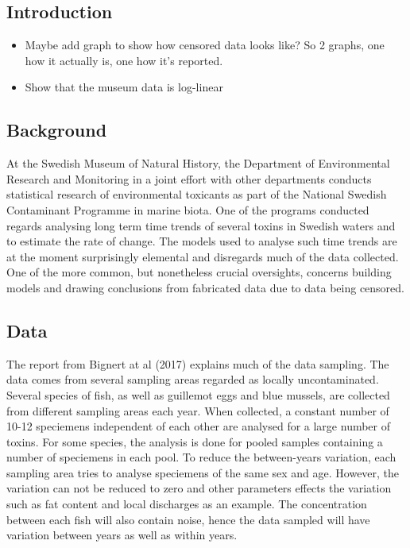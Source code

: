 \documentclass[]{article}
\providecommand{\tightlist}{%
  \setlength{\itemsep}{0pt}\setlength{\parskip}{0pt}}
\begin{document}
\hypertarget{introduction}{%
\subsection{Introduction}\label{introduction}}

\begin{itemize}
\tightlist
\item
  Maybe add graph to show how censored data looks like? So 2 graphs, one
  how it actually is, one how it's reported.
\item
  Show that the museum data is log-linear
\end{itemize}

\hypertarget{background}{%
\subsection{Background}\label{background}}

At the Swedish Museum of Natural History, the Department of
Environmental Research and Monitoring in a joint effort with other
departments conducts statistical research of environmental toxicants as
part of the National Swedish Contaminant Programme in marine biota. One
of the programs conducted regards analysing long term time trends of
several toxins in Swedish waters and to estimate the rate of change. The
models used to analyse such time trends are at the moment surprisingly
elemental and disregards much of the data collected. One of the more
common, but nonetheless crucial oversights, concerns building models and
drawing conclusions from fabricated data due to data being censored.

\hypertarget{data}{%
\subsection{Data}\label{data}}

The report from Bignert at al (2017) explains much of the data sampling.
The data comes from several sampling areas regarded as locally
uncontaminated. Several species of fish, as well as guillemot eggs and
blue mussels, are collected from different sampling areas each year.
When collected, a constant number of 10-12 speciemens independent of
each other are analysed for a large number of toxins. For some species,
the analysis is done for pooled samples containing a number of
speciemens in each pool. To reduce the between-years variation, each
sampling area tries to analyse speciemens of the same sex and age.
However, the variation can not be reduced to zero and other parameters
effects the variation such as fat content and local discharges as an
example. The concentration between each fish will also contain noise,
hence the data sampled will have variation between years as well as
within years.
\end{document}
